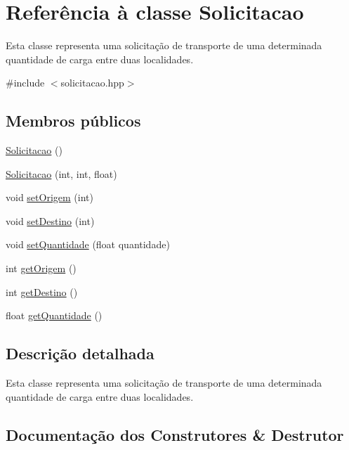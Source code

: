 \hypertarget{classSolicitacao}{}\section{Referência à classe Solicitacao}
\label{classSolicitacao}


Esta classe representa uma solicitação de transporte de uma determinada quantidade de carga entre duas localidades.  




{\ttfamily \#include $<$solicitacao.\+hpp$>$}

\subsection*{Membros públicos}
\begin{DoxyCompactItemize}
\item 
\hyperlink{classSolicitacao_a67c9ab7bb3295e4a5a0933486f7e0f4b}{Solicitacao} ()
\item 
\hyperlink{classSolicitacao_a7488a91778013e8666db5f3dde061e2c}{Solicitacao} (int, int, float)
\item 
void \hyperlink{classSolicitacao_a585f55cfa44c1e16d535935eead17f44}{set\+Origem} (int)
\item 
void \hyperlink{classSolicitacao_ac772a2517a1d395f1a541424d29716cd}{set\+Destino} (int)
\item 
void \hyperlink{classSolicitacao_acf1db9c6843df635aca0bbacae8cf7c7}{set\+Quantidade} (float quantidade)
\item 
int \hyperlink{classSolicitacao_a53a5b37dd6aca895d84ef9991fc7775b}{get\+Origem} ()
\item 
int \hyperlink{classSolicitacao_a8448e5d5b0ca18b7e8ff022415ec6836}{get\+Destino} ()
\item 
float \hyperlink{classSolicitacao_a7e936983b3b1c6d4010649edcbac4819}{get\+Quantidade} ()
\end{DoxyCompactItemize}


\subsection{Descrição detalhada}
Esta classe representa uma solicitação de transporte de uma determinada quantidade de carga entre duas localidades. 

\subsection{Documentação dos Construtores \& Destrutor}
\mbox{\label{classSolicitacao_a67c9ab7bb3295e4a5a0933486f7e0f4b}} 
